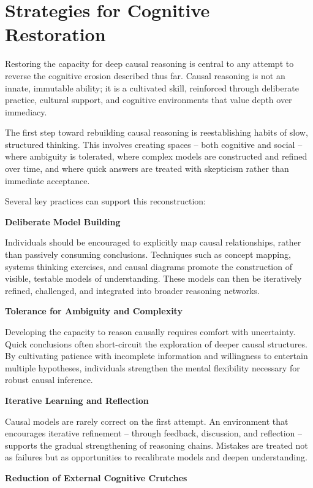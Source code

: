 \chapter{Strategies for Cognitive Restoration}

Restoring the capacity for deep causal reasoning is central to any
attempt to reverse the cognitive erosion described thus far. Causal
reasoning is not an innate, immutable ability; it is a cultivated skill,
reinforced through deliberate practice, cultural support, and cognitive
environments that value depth over immediacy.

The first step toward rebuilding causal reasoning is reestablishing
habits of slow, structured thinking. This involves creating spaces --
both cognitive and social -- where ambiguity is tolerated, where complex
models are constructed and refined over time, and where quick answers
are treated with skepticism rather than immediate acceptance.

Several key practices can support this reconstruction:

\textbf{Deliberate Model Building}

Individuals should be encouraged to explicitly map causal relationships,
rather than passively consuming conclusions. Techniques such as concept
mapping, systems thinking exercises, and causal diagrams promote the
construction of visible, testable models of understanding. These models
can then be iteratively refined, challenged, and integrated into broader
reasoning networks.

\textbf{Tolerance for Ambiguity and Complexity}

Developing the capacity to reason causally requires comfort with
uncertainty. Quick conclusions often short-circuit the exploration of
deeper causal structures. By cultivating patience with incomplete
information and willingness to entertain multiple hypotheses,
individuals strengthen the mental flexibility necessary for robust
causal inference.

\textbf{Iterative Learning and Reflection}

Causal models are rarely correct on the first attempt. An environment
that encourages iterative refinement -- through feedback, discussion, and
reflection -- supports the gradual strengthening of reasoning chains.
Mistakes are treated not as failures but as opportunities to recalibrate
models and deepen understanding.

\textbf{Reduction of External Cognitive Crutches}

